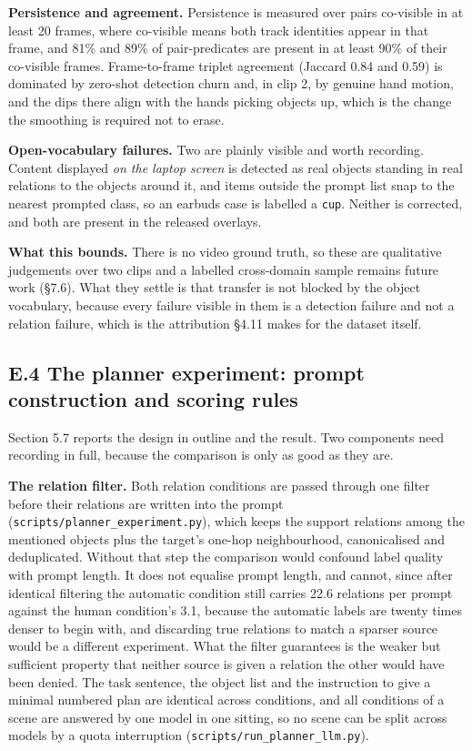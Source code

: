 \textbf{Persistence and agreement.} Persistence is measured over pairs co-visible in at least 20 frames, where co-visible means both track identities appear in that frame, and 81\% and 89\% of pair-predicates are present in at least 90\% of their co-visible frames. Frame-to-frame triplet agreement (Jaccard 0.84 and 0.59) is dominated by zero-shot detection churn and, in clip 2, by genuine hand motion, and the dips there align with the hands picking objects up, which is the change the smoothing is required not to erase.

\textbf{Open-vocabulary failures.} Two are plainly visible and worth recording. Content displayed \textit{on the laptop screen} is detected as real objects standing in real relations to the objects around it, and items outside the prompt list snap to the nearest prompted class, so an earbuds case is labelled a \texttt{cup}. Neither is corrected, and both are present in the released overlays.

\textbf{What this bounds.} There is no video ground truth, so these are qualitative judgements over two clips and a labelled cross-domain sample remains future work (\S{}7.6). What they settle is that transfer is not blocked by the object vocabulary, because every failure visible in them is a detection failure and not a relation failure, which is the attribution \S{}4.11 makes for the dataset itself.

\subsection{E.4 The planner experiment: prompt construction and scoring rules}

Section 5.7 reports the design in outline and the result. Two components need recording in full, because the comparison is only as good as they are.

\textbf{The relation filter.} Both relation conditions are passed through one filter before their relations are written into the prompt (\texttt{scripts/planner\_\allowbreak{}experiment.py}), which keeps the support relations among the mentioned objects plus the target's one-hop neighbourhood, canonicalised and deduplicated. Without that step the comparison would confound label quality with prompt length. It does not equalise prompt length, and cannot, since after identical filtering the automatic condition still carries 22.6 relations per prompt against the human condition's 3.1, because the automatic labels are twenty times denser to begin with, and discarding true relations to match a sparser source would be a different experiment. What the filter guarantees is the weaker but sufficient property that neither source is given a relation the other would have been denied. The task sentence, the object list and the instruction to give a minimal numbered plan are identical across conditions, and all conditions of a scene are answered by one model in one sitting, so no scene can be split across models by a quota interruption (\texttt{scripts/run\_\allowbreak{}planner\_\allowbreak{}llm.py}).

